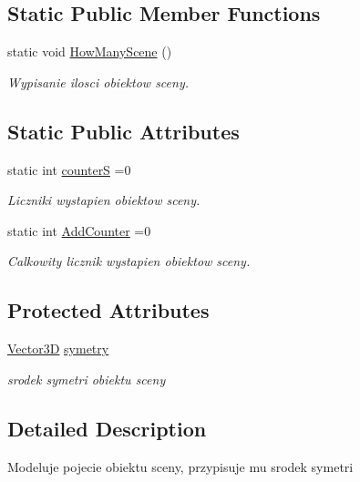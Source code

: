 \subsection*{Static Public Member Functions}
\begin{DoxyCompactItemize}
\item 
static void \hyperlink{class_object_of_scene_a94770327cfa3c391fbf6b8e4f9635248}{How\+Many\+Scene} ()
\begin{DoxyCompactList}\small\item\em Wypisanie ilosci obiektow sceny. \end{DoxyCompactList}\end{DoxyCompactItemize}
\subsection*{Static Public Attributes}
\begin{DoxyCompactItemize}
\item 
static int \hyperlink{class_object_of_scene_ae1b26e0c68453235a991601aa8f8c8e5}{counterS} =0
\begin{DoxyCompactList}\small\item\em Liczniki wystapien obiektow sceny. \end{DoxyCompactList}\item 
static int \hyperlink{class_object_of_scene_a4f29f829eca02965019b1d0bc28f3af1}{Add\+Counter} =0
\begin{DoxyCompactList}\small\item\em Calkowity licznik wystapien obiektow sceny. \end{DoxyCompactList}\end{DoxyCompactItemize}
\subsection*{Protected Attributes}
\begin{DoxyCompactItemize}
\item 
\hyperlink{vector3_d_8hh_a8790ef07836c1639da216f46501979c0}{Vector3D} \hyperlink{class_object_of_scene_a3940aba3014aefed326cdc4301333af1}{symetry}
\begin{DoxyCompactList}\small\item\em srodek symetri obiektu sceny \end{DoxyCompactList}\end{DoxyCompactItemize}


\subsection{Detailed Description}
Modeluje pojecie obiektu sceny, przypisuje mu srodek symetri 

